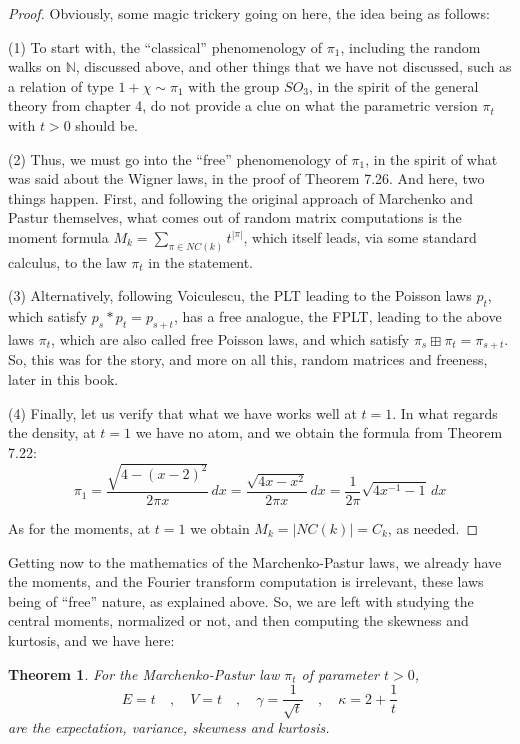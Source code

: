 \documentclass[12pt]{amsbook}
\newtheorem{theorem}{Theorem}[chapter]
\begin{document}
\begin{proof}
Obviously, some magic trickery going on here, the idea being as follows:

\medskip

(1) To start with, the ``classical'' phenomenology of $\pi_1$, including the random walks on $\mathbb N$, discussed above, and other things that we have not discussed, such as a relation of type $1+\chi\sim\pi_1$ with the group $SO_3$, in the spirit of the general theory from chapter 4, do not provide a clue on what the parametric version $\pi_t$ with $t>0$ should be.

\medskip

(2) Thus, we must go into the ``free'' phenomenology of $\pi_1$, in the spirit of what was said about the Wigner laws, in the proof of Theorem 7.26. And here, two things happen. First, and following the original approach of Marchenko and Pastur themselves, what comes out of random matrix computations is the moment formula $M_k=\sum_{\pi\in NC(k)}t^{|\pi|}$, which itself leads, via some standard calculus, to the law $\pi_t$ in the statement.

\medskip

(3) Alternatively, following Voiculescu, the PLT leading to the Poisson laws $p_t$, which satisfy $p_s*p_t=p_{s+t}$, has a free analogue, the FPLT, leading to the above laws $\pi_t$, which are also called free Poisson laws, and which satisfy $\pi_s\boxplus\pi_t=\pi_{s+t}$. So, this was for the story, and more on all this, random matrices and freeness, later in this book.

\medskip

(4) Finally, let us verify that what we have works well at $t=1$. In what regards the density, at $t=1$ we have no atom, and we obtain the formula from Theorem 7.22:
$$\pi_1=\frac{\sqrt{4-(x-2)^2}}{2\pi x}\,dx
=\frac{\sqrt{4x-x^2}}{2\pi x}\,dx
=\frac{1}{2\pi}\sqrt{4x^{-1}-1}\,dx$$

As for the moments, at $t=1$ we obtain $M_k=|NC(k)|=C_k$, as needed.
\end{proof}

Getting now to the mathematics of the Marchenko-Pastur laws, we already have the moments, and the Fourier transform computation is irrelevant, these laws being of ``free'' nature, as explained above. So, we are left with studying the central moments, normalized or not, and then computing the skewness and kurtosis, and we have here:

\begin{theorem}
For the Marchenko-Pastur law $\pi_t$ of parameter $t>0$,
$$E=t\quad,\quad V=t\quad,\quad \gamma=\frac{1}{\sqrt{t}}\quad,\quad \kappa=2+\frac{1}{t}$$
are the expectation, variance, skewness and kurtosis.
\end{theorem}
\end{document}
